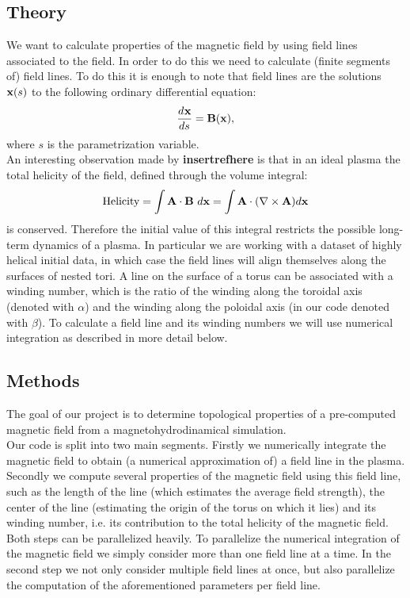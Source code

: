 \documentclass{article}
\newcommand{\Dif}[3][ ]{\ensuremath{\frac{d^{#1} #2}{{d #3}^{#1}}}}
\renewcommand{\vec}{\bold}
\begin{document}
\subsection{Theory}
We want to calculate properties of the magnetic field by using field lines associated to the field. In order to do this we need to calculate (finite segments of) field lines. To do this it is enough to note that field lines are the solutions $\vec x(s)$ to the following ordinary differential equation:
\[\Dif{\vec x}{s} = \vec B(\vec x),\]
where $s$ is the parametrization variable.\\
An interesting observation made by \textbf{insertrefhere} is that in an ideal plasma the total helicity of the field, defined through the volume integral:
\[
\text{Helicity} = \int\vec{A}\cdot\vec{B}\ d\vec{x} = \int\vec{A}\cdot (\nabla\times\vec{A})d\vec{x}
\]
is conserved. Therefore the initial value of this integral restricts the possible long-term dynamics of a plasma. In particular we are working with a dataset of highly helical initial data, in which case the field lines will align themselves along the surfaces of nested tori. A line on the surface of a torus can be associated with a winding number, which is the ratio of the winding along the toroidal axis (denoted with $\alpha$) and the winding along the poloidal axis (in our code denoted with $\beta$). To calculate a field line and its winding numbers we will use numerical integration as described in more detail below.


\subsection{Methods}
The goal of our project is to determine topological properties of a pre-computed magnetic field from a magnetohydrodinamical simulation.\\
Our code is split into two main segments. Firstly we numerically integrate the magnetic field to obtain (a numerical approximation of) a field line in the plasma. Secondly we compute several properties of the magnetic field using this field line, such as the length of the line (which estimates the average field strength), the center of the line (estimating the origin of the torus on which it lies) and its winding number, i.e. its contribution to the total helicity of the magnetic field.\\
Both steps can be parallelized heavily. To parallelize the numerical integration of the magnetic field we simply consider more than one field line at a time. In the second step we not only consider multiple field lines at once, but also parallelize the computation of the aforementioned parameters per field line.\\
\end{document}
